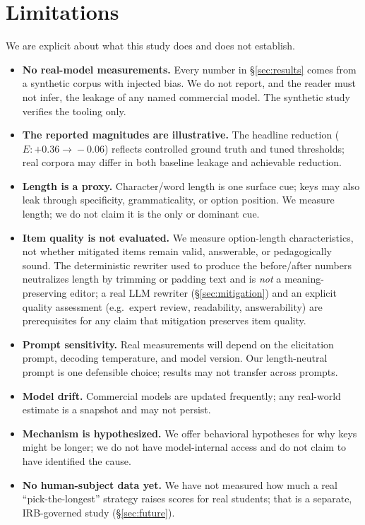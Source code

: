 \documentclass[10pt,twocolumn]{article}
\begin{document}
\section{Limitations}
\label{sec:limitations}

We are explicit about what this study does and does not establish.

\begin{itemize}[leftmargin=1.3em,itemsep=2pt,topsep=2pt]
\item \textbf{No real-model measurements.} Every number in
\S\ref{sec:results} comes from a synthetic corpus with injected bias. We do not
report, and the reader must not infer, the leakage of any named commercial
model. The synthetic study verifies the tooling only.
\item \textbf{The reported magnitudes are illustrative.} The headline reduction
($E:{+}0.36\!\to\!{-}0.06$) reflects controlled ground truth and tuned
thresholds; real corpora may differ in both baseline leakage and achievable
reduction.
\item \textbf{Length is a proxy.} Character/word length is one surface cue;
keys may also leak through specificity, grammaticality, or option position. We
measure length; we do not claim it is the only or dominant cue.
\item \textbf{Item quality is not evaluated.} We measure option-length
characteristics, not whether mitigated items remain valid, answerable, or
pedagogically sound. The deterministic rewriter used to produce the before/after
numbers neutralizes length by trimming or padding text and is \emph{not} a
meaning-preserving editor; a real LLM rewriter (\S\ref{sec:mitigation}) and an
explicit quality assessment (e.g.\ expert review, readability, answerability) are
prerequisites for any claim that mitigation preserves item quality.
\item \textbf{Prompt sensitivity.} Real measurements will depend on the
elicitation prompt, decoding temperature, and model version. Our length-neutral
prompt is one defensible choice; results may not transfer across prompts.
\item \textbf{Model drift.} Commercial models are updated frequently; any
real-world estimate is a snapshot and may not persist.
\item \textbf{Mechanism is hypothesized.} We offer behavioral hypotheses for
why keys might be longer; we do not have model-internal access and do not claim
to have identified the cause.
\item \textbf{No human-subject data yet.} We have not measured how much a real
``pick-the-longest'' strategy raises scores for real students; that is a
separate, IRB-governed study (\S\ref{sec:future}).
\end{itemize}
\end{document}
